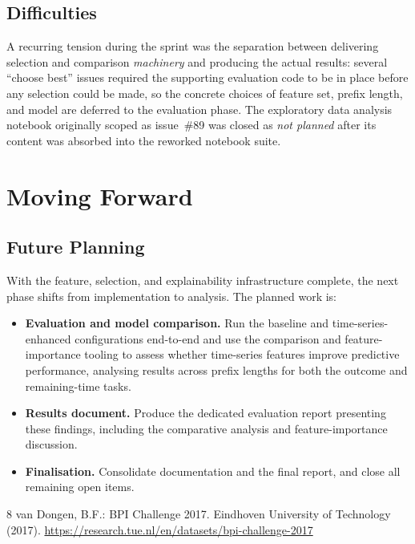 \documentclass[runningheads]{llncs}
\begin{document}
\subsection{Difficulties}
A recurring tension during the sprint was the separation between
delivering selection and comparison \emph{machinery} and producing the actual results: several
``choose best'' issues required the supporting evaluation code to be in place before any
selection could be made, so the concrete choices of feature set, prefix length, and model are
deferred to the evaluation phase. The exploratory data analysis notebook originally scoped as
issue~\#89 was closed as \emph{not planned} after its content was absorbed into the reworked
notebook suite.

\section{Moving Forward}

\subsection{Future Planning}
With the feature, selection, and explainability infrastructure complete, the next phase shifts
from implementation to analysis. The planned work is:
\begin{itemize}
    \item \textbf{Evaluation and model comparison.} Run the baseline and time-series-enhanced
          configurations end-to-end and use the comparison and feature-importance tooling to
          assess whether time-series features improve predictive performance, analysing results
          across prefix lengths for both the outcome and remaining-time tasks.
    \item \textbf{Results document.} Produce the dedicated evaluation report presenting these
          findings, including the comparative analysis and feature-importance discussion.
    \item \textbf{Finalisation.} Consolidate documentation and the final report, and close all
          remaining open items.
\end{itemize}

\begin{thebibliography}{8}
    van Dongen, B.F.: BPI Challenge 2017. Eindhoven University of Technology (2017). \url{https://research.tue.nl/en/datasets/bpi-challenge-2017}
\end{thebibliography}
\end{document}
